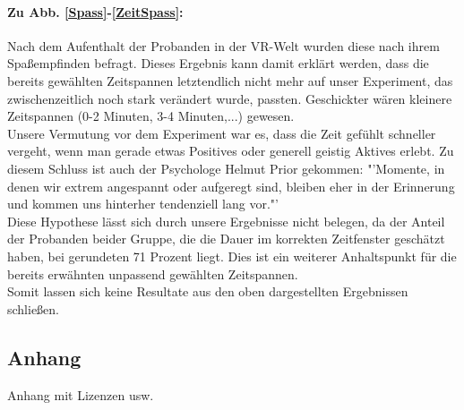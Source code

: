 \documentclass{Paper}
\begin{document}
\paragraph{Zu Abb. \ref{Spass}-\ref{ZeitSpass}:} Nach dem Aufenthalt der Probanden in der VR-Welt wurden diese nach ihrem Spaßempfinden befragt. Dieses Ergebnis kann damit erklärt werden, dass die bereits gewählten Zeitspannen letztendlich nicht mehr auf unser Experiment, das zwischenzeitlich noch stark verändert wurde, passten. Geschickter wären kleinere Zeitspannen (0-2 Minuten, 3-4 Minuten,...) gewesen.\\
Unsere Vermutung vor dem Experiment war es, dass die Zeit gefühlt schneller vergeht, wenn man gerade etwas Positives oder generell geistig Aktives erlebt. Zu diesem Schluss ist auch der Psychologe Helmut Prior gekommen: "'Momente, in denen wir extrem angespannt oder aufgeregt sind, bleiben eher in der Erinnerung und kommen uns hinterher tendenziell lang vor."' \cite{Irle2017} \\
Diese Hypothese lässt sich durch unsere Ergebnisse nicht belegen, da der Anteil der Probanden beider Gruppe, die die Dauer im korrekten Zeitfenster geschätzt haben, bei gerundeten 71 Prozent liegt. Dies ist ein weiterer Anhaltspunkt für die bereits erwähnten unpassend gewählten Zeitspannen.\\
Somit lassen sich keine Resultate aus den oben dargestellten Ergebnissen schließen.





\begin{appendix}
\section{Anhang}
	Anhang mit Lizenzen usw.
\end{appendix}	

\vfill %
\end{document}

